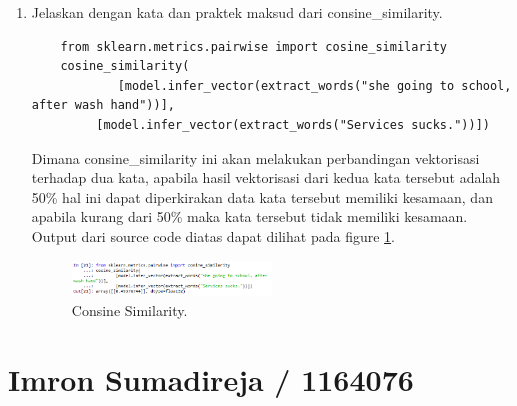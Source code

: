 \begin{enumerate}
\item Jelaskan dengan kata dan praktek maksud dari consine\_similarity.

	\begin{verbatim}
	from sklearn.metrics.pairwise import cosine_similarity
	cosine_similarity(
        	[model.infer_vector(extract_words("she going to school, after wash hand"))],
       	 [model.infer_vector(extract_words("Services sucks."))])
	\end{verbatim}

	\subitem Dimana consine\_similarity ini akan melakukan perbandingan vektorisasi terhadap dua kata, apabila hasil vektorisasi dari kedua kata tersebut adalah 50\% hal ini dapat diperkirakan data kata tersebut memiliki kesamaan, dan apabila kurang dari 50\% maka kata tersebut tidak memiliki kesamaan. Output dari source code diatas dapat dilihat pada figure \ref{YNC5-29}.

	\begin{figure}[!htbp]
		\centerline{\includegraphics[width=0.5\textwidth]{figures/YN/Chapter5/Praktek/YNC5-29.PNG}}
		\caption{Consine Similarity.}
		\label{YNC5-29}
	\end{figure}

\end{enumerate}

\section{Imron Sumadireja / 1164076}
